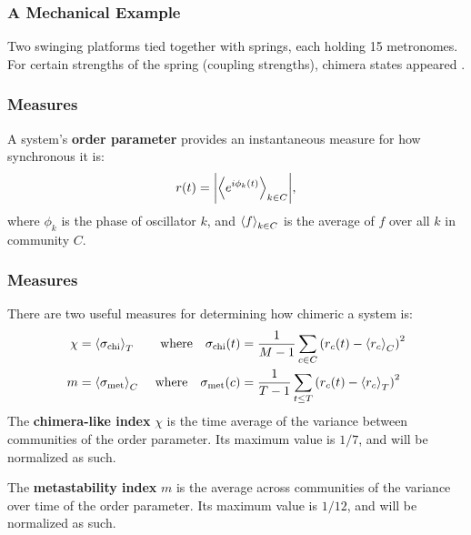 \documentclass[hyperref={hidelinks}]{beamer}
\newcommand*{\chimera}{\chi}
\newcommand*{\meta}{m}
\newcommand*{\ordparam}{r}
\newcommand*{\phase}{\phi}
\begin{document}
\begin{frame}
  \frametitle{A Mechanical Example}
  Two swinging platforms tied together with springs, each holding 15 metronomes.
  For certain strengths of the spring (coupling strengths), chimera states appeared \cite{Martens2013}.

  \vfill

\end{frame}

\begin{frame}
  \frametitle{Measures}
  A system's \textbf{order parameter} provides an instantaneous measure for how synchronous it is:
  \begin{equation}
    \label{eq:order}
    \ordparam(t)
    =
    \abs{\expval{e^{i \phase_{k}(t)}}_{k \in C}},
  \end{equation}
  where $\phase_{k}$ is the phase of oscillator $k$, and $\ev{f}_{k \in C}$ is the average of $f$ over all $k$ in community $C$.

\end{frame}

\begin{frame}
  \frametitle{Measures}
  There are two useful measures for determining how chimeric a system is:
  \begin{align}
    \label{eq:chimera}
    \chimera
    &=
      \expval{\sigma_{\text{chi}}}_{T}
    & \text{ where} \quad
      \sigma_{\text{chi}}(t)
    &=
      \frac{1}{M - 1} \sum_{c \in C}\pqty{\ordparam_{c}(t) - \expval{\ordparam_{c}}_{C}}^{2} \\
    \label{eq:metastability}
    \meta
    &=
      \expval{\sigma_{\text{met}}}_{C}
    & \text{ where} \quad
      \sigma_{\text{met}}(c)
    &=
      \frac{1}{T - 1} \sum_{t \leq T}\pqty{\ordparam_{c}(t) - \expval{\ordparam_{c}}_{T}}^{2}
  \end{align}
  The \textbf{chimera-like index} $\chimera$ is the time average of the variance between communities of the order parameter.
  Its maximum value is $1/7$, and will be normalized as such.

  The \textbf{metastability index} $\meta$ is the average across communities of the variance over time of the order parameter.
  Its maximum value is $1/12$, and will be normalized as such.

\end{frame}
\end{document}
